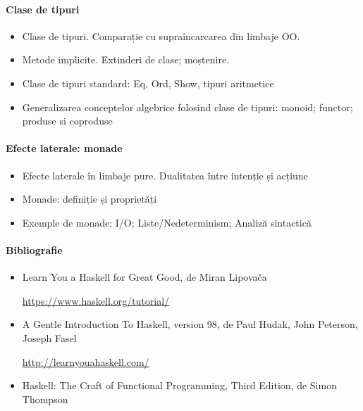 \documentclass[romanian]{article}
\begin{document}
\paragraph{Clase de tipuri}
\begin{itemize}
\item Clase de tipuri.  Comparație cu supraîncarcarea din limbaje OO.
\item Metode implicite. Extinderi de clase; moștenire. 
\item Clase de tipuri standard: Eq, Ord, Show, tipuri aritmetice 
\item Generalizarea conceptelor algebrice folosind clase de tipuri: monoid; functor; produse si coproduse
\end{itemize} 
\paragraph{Efecte laterale: monade}
\begin{itemize}
\item Efecte laterale în limbaje pure. Dualitatea între intenție și acțiune
\item Monade: definiție și proprietăți
\item Exemple de monade: I/O; Liste/Nedeterminism; Analiză sintactică
\end{itemize}

\vfill
\paragraph{Bibliografie}
\begin{itemize}
\item  Learn You a Haskell for Great Good, de Miran Lipova\v{c}a

\url{https://www.haskell.org/tutorial/}
\item A Gentle Introduction To Haskell, version 98, de Paul Hudak, John Peterson, 
 Joseph Fasel
 
 \url{http://learnyouahaskell.com/}
 \item Haskell: The Craft of Functional Programming, Third Edition, de Simon Thompson

\end{itemize}
\end{document}
